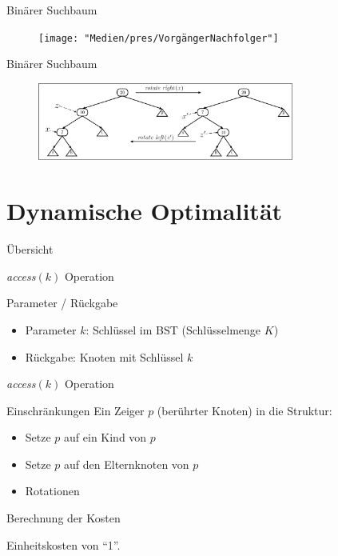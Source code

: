 \documentclass[11pt]{beamer}
\begin{document}
			\begin{frame} {Binärer Suchbaum}
			\begin{figure}[h]
				\centering
				\texttt{[image: "Medien/pres/VorgängerNachfolger"]}
			\end{figure}    
		\end{frame}
	
	\begin{frame} {Binärer Suchbaum}
			\begin{figure}[h]
				\centering
				\includegraphics[width=0.75\textwidth]{"Medien/pres/LinksRechtsRotation"}
			\end{figure}    
		\end{frame}	
	
	\section{Dynamische Optimalität}
	
		\begin{frame} {Übersicht}
			\tableofcontents[currentsection]   
		\end{frame}
	
	   
    
    
  \begin{frame} {	\textit{access}$\left(k\right)$ Operation}
    \begin{block}{Parameter / Rückgabe}
    	\begin{itemize}
    		\item Parameter $k$: Schlüssel im BST (Schlüsselmenge $K$)
    		\item Rückgabe: Knoten mit Schlüssel $k$
      \end{itemize}
    			
    \end{block}	
  \end{frame}	
     
     \begin{frame} {	\textit{access}$\left(k\right)$ Operation}
     	\begin{block}{Einschränkungen}
     		Ein Zeiger $p$ (berührter Knoten) in die Struktur:
     		\begin{itemize}
     			\item Setze $p$ auf ein Kind von $p$ 
     			\item Setze $p$ auf den Elternknoten von $p$ 
     			\item Rotationen 
     		\end{itemize}	
     	\end{block}	
     	\pause 
     	\begin{block}{Berechnung der Kosten}
     		
     		Einheitskosten von \enquote{1}.
     	\end{block}	    	
     \end{frame}	    
     
\end{document}

